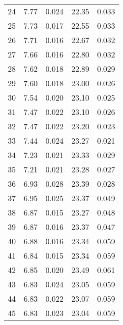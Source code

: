 \begin{table}
\begin{tabular}{c|ll|ll}
24 & 7.77 & 0.024 & 22.35 & 0.033 \\
25 & 7.73 & 0.017 & 22.55 & 0.033 \\
26 & 7.71 & 0.016 & 22.67 & 0.032 \\
27 & 7.66 & 0.016 & 22.80 & 0.032 \\
28 & 7.62 & 0.018 & 22.89 & 0.029 \\
29 & 7.60 & 0.018 & 23.00 & 0.026 \\
30 & 7.54 & 0.020 & 23.10 & 0.025 \\
31 & 7.47 & 0.022 & 23.10 & 0.026 \\
32 & 7.47 & 0.022 & 23.20 & 0.023 \\
33 & 7.44 & 0.024 & 23.27 & 0.021 \\
34 & 7.23 & 0.021 & 23.33 & 0.029 \\
35 & 7.21 & 0.021 & 23.28 & 0.027 \\
36 & 6.93 & 0.028 & 23.39 & 0.028 \\
37 & 6.95 & 0.025 & 23.37 & 0.049 \\
38 & 6.87 & 0.015 & 23.27 & 0.048 \\
39 & 6.87 & 0.016 & 23.37 & 0.047 \\
40 & 6.88 & 0.016 & 23.34 & 0.059 \\
41 & 6.84 & 0.015 & 23.34 & 0.059 \\
42 & 6.85 & 0.020 & 23.49 & 0.061 \\
43 & 6.83 & 0.024 & 23.05 & 0.059 \\
44 & 6.83 & 0.022 & 23.07 & 0.059 \\
45 & 6.83 & 0.023 & 23.04 & 0.059 \\
               \hline
        \end{tabular}
    \end{table}
    \clearpage

